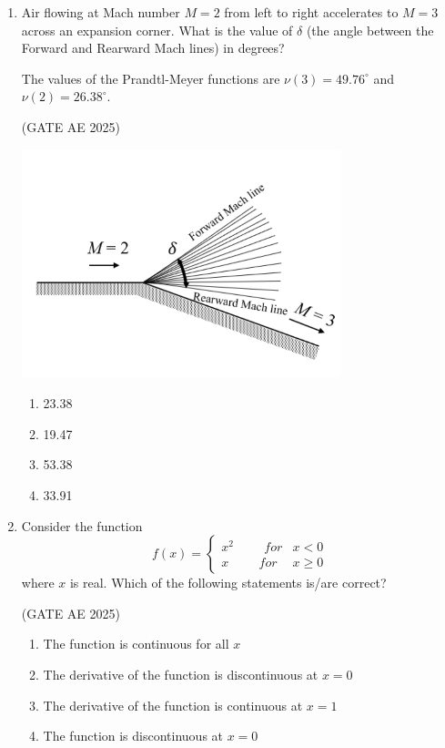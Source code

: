 \documentclass[journal,12pt,onecolumn]{IEEEtran}
\theoremstyle{remark}
\begin{document}
\begin{flushleft}
\begin{enumerate}
\item Air flowing at Mach number $M = 2$ from left to right accelerates to $M = 3$ across an expansion corner. What is the value of $\delta$ (the angle between the Forward and Rearward Mach lines) in degrees? 

The values of the Prandtl-Meyer functions are $\nu(3) = 49.76^\circ$ and $\nu(2) = 26.38^\circ$. 

\hfill (GATE AE 2025)

\begin{center}
\includegraphics[width=0.5\columnwidth]{figs/44.png}
\end{center}

\begin{enumerate}
\item 23.38  
\item 19.47  
\item 53.38  
\item 33.91
\end{enumerate}  

\item Consider the function  
\[
f(x) =
\begin{cases}
x^2 \hspace{1cm} for & x < 0 \\
x \hspace{1cm} for & x \ge 0
\end{cases}
\]  
where $x$ is real. Which of the following statements is/are correct?  

\hfill (GATE AE 2025)

\begin{enumerate}
\item The function is continuous for all $x$  
\item The derivative of the function is discontinuous at $x = 0$  
\item The derivative of the function is continuous at $x = 1$  
\item The function is discontinuous at $x = 0$ 
\end{enumerate}


\end{enumerate}
\end{flushleft}
\end{document}
